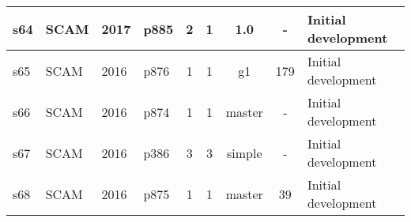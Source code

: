 \begin{longtable}{| l | l | l | l | c | c | c | c | l |}
    \hline
s64 & SCAM & 2017 & p885 & 2 & 1 & 1.0 & - & Initial development \\
    \hline
s65 & SCAM & 2016 & p876 & 1 & 1 & g1 & 179 & Initial development \\
    \hline
s66 & SCAM & 2016 & p874 & 1 & 1 & master & - & Initial development \\
    \hline
s67 & SCAM & 2016 & p386 & 3 & 3 & simple & - & Initial development \\
    \hline
s68 & SCAM & 2016 & p875 & 1 & 1 & master & 39 & Initial development \\
    \hline
  \hline
\end{longtable}
